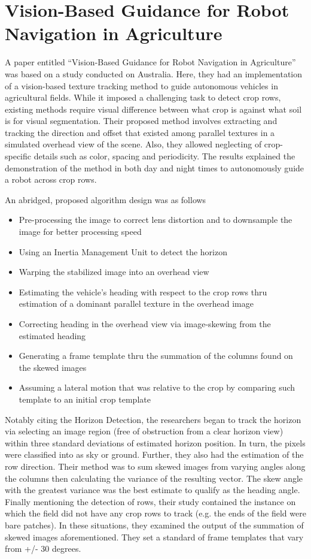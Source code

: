 \section{Vision-Based Guidance for Robot Navigation in Agriculture}

A paper entitled “Vision-Based Guidance for Robot Navigation in Agriculture” was based on a study conducted on Australia. Here, they had an implementation of a vision-based texture tracking method to guide autonomous vehicles in agricultural fields. While it imposed a challenging task to detect crop rows, existing methods require visual difference between what crop is against what soil is for visual segmentation. Their proposed method involves extracting and tracking the direction and offset that existed among parallel textures in a simulated overhead view of the scene. Also, they allowed neglecting of crop-specific details such as color, spacing and periodicity. The results explained the demonstration of the method in both day and night times to autonomously guide a robot across crop rows.
 
    An abridged, proposed algorithm design was as follows
\begin{itemize}
\item Pre-processing the image to correct lens distortion and to downsample the image for better processing speed\item Using an Inertia Management Unit to detect the horizon
\item Warping the stabilized image into an overhead view
\item Estimating the vehicle’s heading with respect to the crop rows thru estimation of a dominant parallel texture in the overhead image
\item Correcting heading in the overhead view via image-skewing from the estimated heading
\item Generating a frame template thru the summation of the columns found on the skewed images
\item Assuming a lateral motion that was relative to the crop by comparing such template to an initial crop template
\end{itemize}
\tab Notably citing the Horizon Detection, the researchers began to track the horizon via selecting an image region (free of obstruction from a clear horizon view) within three standard deviations of estimated horizon position. In turn, the pixels were classified into as sky or ground. Further, they also had the estimation of the row direction. Their method was to sum skewed images from varying angles along the columns then calculating the variance of the resulting vector. The skew angle with the greatest variance was the best estimate to qualify as the heading angle. Finally mentioning the detection of rows, their study contained the instance on which the field did not have any crop rows to track (e.g. the ends of the field were bare patches). In these situations, they examined the output of the summation of skewed images aforementioned. They set a standard of frame templates that vary from +/- 30 degrees.

